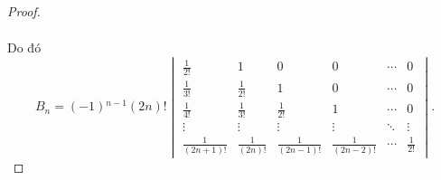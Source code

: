 \documentclass[class=nhvh-linear-algebra,crop=false]{standalone}
\begin{document}
\begin{proof}
\begin{align*}
	\end{align*}
	\endgroup{}
	\par Do đó
	\[
		B_{n} = (-1){}^{n-1}(2n)!
		\begin{vmatrix}
			\frac{1}{2!}      & 1               & 0                 & 0                 & \cdots & 0            \\
			\frac{1}{3!}      & \frac{1}{2!}    & 1                 & 0                 & \cdots & 0            \\
			\frac{1}{4!}      & \frac{1}{3!}    & \frac{1}{2!}      & 1                 & \cdots & 0            \\
			\vdots            & \vdots          & \vdots            & \vdots            & \ddots & \vdots       \\
			\frac{1}{(2n+1)!} & \frac{1}{(2n)!} & \frac{1}{(2n-1)!} & \frac{1}{(2n-2)!} & \cdots & \frac{1}{2!}
		\end{vmatrix}.
	\]


\end{proof}
\end{document}
